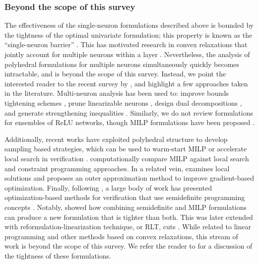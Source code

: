 \subsubsection{Beyond the scope of this survey}

The effectiveness of the single-neuron formulations described above is bounded by the tightness of the optimal univariate formulation; this property is known as the ``single-neuron barrier'' \citep{salman2019convex}. 
This has motivated research in convex relaxations that jointly account for multiple neurons within a layer \citep{singh2019beyond}. 
Nevertheless, the analysis of polyhedral formulations for multiple neurons simultaneously quickly becomes intractable, and is beyond the scope of this survey. Instead, we point the interested reader to the recent survey by \cite{roth2021primer}, and highlight a few approaches taken in the literature. Multi-neuron analysis has been used to: improve bounds tightening schemes \citep{rossig2021advances}, prune linearizable neurons \citep{botoeva2020efficient}, design dual decompositions \citep{ferrari2022complete}, and generate strengthening inequalities \citep{serra2020empirical}. %
Similarly, we do not review formulations for ensembles of ReLU networks, though MILP formulations have been proposed \citep{wang2021ensemble,wang2023optimizing}. 

Additionally, recent works have exploited polyhedral structure to develop sampling based strategies, which can be used to warm-start MILP or accelerate local search in verification \citep{perakis2022optimizing,wu2022efficient}. 
\cite{lombardi2017empirical} computationally compare MILP against local search and constraint programming approaches. 
In a related vein, \cite{cheon2022outer} examines local solutions and proposes an outer approximation method to improve gradient-based optimization. 
Finally, following \cite{raghunathan2018semidefinite}, a large body of work has presented optimization-based methods for verification that use semidefinite programming concepts \citep{dathathri2020enabling,fazlyab2020safety,newton2021exploiting}.
Notably, \cite{batten2021efficient} showed how combining semidefinite and MILP formulations can produce a new formulation that is tighter than both. This was later extended with reformulation-linearization technique, or RLT, cuts \citep{lan2022tight}. 
While related to linear programming and other methods based on convex relaxations, this stream of work is beyond the scope of this survey. 
We refer the reader to \cite{zhang2020tightness} for a discussion of the tightness of these formulations. 

